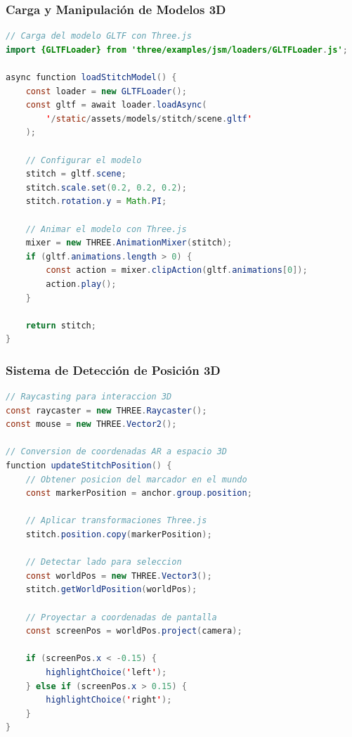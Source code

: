 \documentclass{beamer}
\begin{document}
\begin{frame}[fragile]
\frametitle{Carga y Manipulación de Modelos 3D}
\begin{lstlisting}[language=Java, basicstyle=\tiny]
// Carga del modelo GLTF con Three.js
import {GLTFLoader} from 'three/examples/jsm/loaders/GLTFLoader.js';

async function loadStitchModel() {
    const loader = new GLTFLoader();
    const gltf = await loader.loadAsync(
        '/static/assets/models/stitch/scene.gltf'
    );
    
    // Configurar el modelo
    stitch = gltf.scene;
    stitch.scale.set(0.2, 0.2, 0.2);
    stitch.rotation.y = Math.PI;
    
    // Animar el modelo con Three.js
    mixer = new THREE.AnimationMixer(stitch);
    if (gltf.animations.length > 0) {
        const action = mixer.clipAction(gltf.animations[0]);
        action.play();
    }
    
    return stitch;
}
\end{lstlisting}
\end{frame}

\begin{frame}[fragile]
\frametitle{Sistema de Detección de Posición 3D}
\begin{lstlisting}[language=Java, basicstyle=\tiny]
// Raycasting para interaccion 3D
const raycaster = new THREE.Raycaster();
const mouse = new THREE.Vector2();

// Conversion de coordenadas AR a espacio 3D
function updateStitchPosition() {
    // Obtener posicion del marcador en el mundo
    const markerPosition = anchor.group.position;
    
    // Aplicar transformaciones Three.js
    stitch.position.copy(markerPosition);
    
    // Detectar lado para seleccion
    const worldPos = new THREE.Vector3();
    stitch.getWorldPosition(worldPos);
    
    // Proyectar a coordenadas de pantalla
    const screenPos = worldPos.project(camera);
    
    if (screenPos.x < -0.15) {
        highlightChoice('left');
    } else if (screenPos.x > 0.15) {
        highlightChoice('right');
    }
}
\end{lstlisting}
\end{frame}
\end{document}
